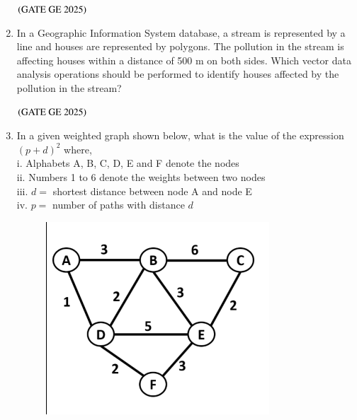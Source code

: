 \documentclass[journal,12pt,onecolumn]{IEEEtran}
\theoremstyle{remark}
\begin{document}
\begin{enumerate}
\begin{enumerate}
\end{enumerate}
\hfill $\left(\text{GATE GE 2025}\right)$
\bigskip
\item In a Geographic Information System database, a stream is represented by a line and houses are represented by polygons. The pollution in the stream is affecting houses within a distance of 500 m on both sides. Which vector data analysis operations should be performed to identify houses affected by the pollution in the stream?
\begin{enumerate}
\end{enumerate}
\hfill $\left(\text{GATE GE 2025}\right)$
\bigskip
\item In a given weighted graph shown below, what is the value of the expression $(p + d)^2$ where,\\
i. Alphabets A, B, C, D, E and F denote the nodes\\
ii. Numbers 1 to 6 denote the weights between two nodes\\
iii. $d =$ shortest distance between node A and node E\\
iv. $p =$ number of paths with distance $d$
\begin{figure}[H]
    \centering
    \includegraphics[width=0.4\columnwidth]{figs/fig7.png}
    \caption{}
    \label{figs:fig7}
\end{figure}

\end{enumerate}
\end{document}
